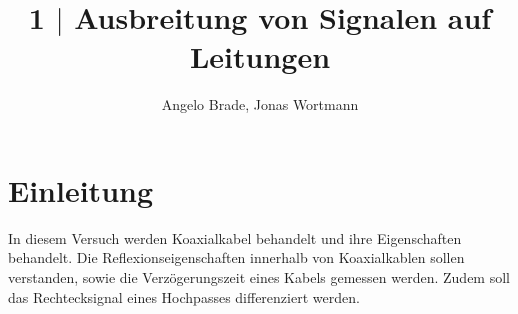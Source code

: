 \documentclass[a4paper,12pt]{article}
\numberwithin{equation}{section}
\begin{document}

\title{1 $|$ Ausbreitung von Signalen auf Leitungen}
\author{Angelo Brade, Jonas Wortmann}
\maketitle
{}


\newpage


\fancyhead[L]{\thepage}
\fancyfoot[C]{}

\tableofcontents


\newpage


\fancyhead[R]{\leftmark\\\rightmark}

\section{Einleitung}
In diesem Versuch werden Koaxialkabel behandelt und ihre Eigenschaften behandelt.
Die Reflexionseigenschaften innerhalb von Koaxialkablen sollen verstanden, sowie die Verzögerungszeit eines Kabels gemessen werden.
Zudem soll das Rechtecksignal eines Hochpasses differenziert werden.

\newpage
\end{document}

